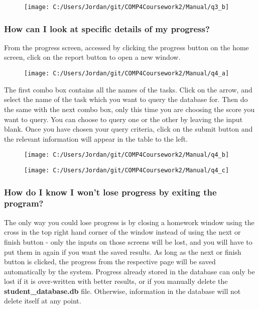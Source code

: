 \begin{figure}[H]
    \texttt{[image: C:/Users/Jordan/git/COMP4Coursework2/Manual/q3\_b]}
\end{figure}

\subsubsection{How can I look at specific details of my progress?}

From the progress screen, accessed by clicking the progress button on the home screen, click on the report button to open a new window.

\begin{figure}[H]
    \texttt{[image: C:/Users/Jordan/git/COMP4Coursework2/Manual/q4\_a]}
\end{figure}

The first combo box contains all the names of the tasks. Click on the arrow, and select the name of the task which you want to query the database for. Then do the same with the next combo box, only this time you are choosing the score you want to query. You can choose to query one or the other by leaving the input blank. Once you have chosen your query criteria, click on the submit button and the relevant information will appear in the table to the left.

\begin{figure}[H]
    \texttt{[image: C:/Users/Jordan/git/COMP4Coursework2/Manual/q4\_b]}
\end{figure}

\begin{figure}[H]
    \texttt{[image: C:/Users/Jordan/git/COMP4Coursework2/Manual/q4\_c]}
\end{figure}

\subsubsection{How do I know I won't lose progress by exiting the program?}

The only way you could lose progress is by closing a homework window using the cross in the top right hand corner of the window instead of using the next or finish button - only the inputs on those screens will be lost, and you will have to put them in again if you want the saved results. As long as the next or finish button is clicked, the progress from the respective page will be saved automatically by the system. Progress already stored in the database can only be lost if it is over-written with better results, or if you manually delete the \textbf{student\_database.db} file. Otherwise, information in the database will not delete itself at any point.

